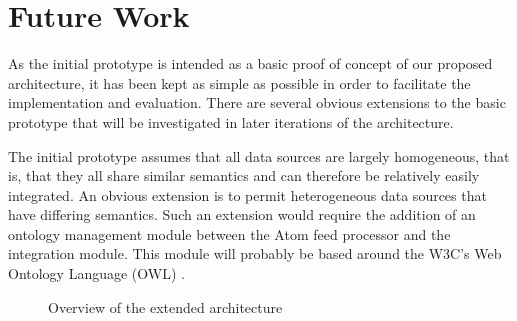 \documentclass{CRPITStyle}
\begin{document}
\section{Future Work}
\label{sec-future-work}

As the initial prototype is intended as a basic proof of concept of our
proposed architecture, it has been kept as simple as possible in order
to facilitate the implementation and evaluation. There are several
obvious extensions to the basic prototype that will be investigated in
later iterations of the architecture.

The initial prototype assumes that all data sources are largely
homogeneous, that is, that they all share similar semantics and can
therefore be relatively easily integrated. An obvious extension is to
permit heterogeneous data sources that have differing semantics. Such an
extension would require the addition of an ontology management module
between the Atom feed processor and the integration module. This module
will probably be based around the W3C's Web Ontology Language (OWL)
\cite{McGu-DL-2004-OWL}.

\begin{figure}[htb]
	\caption{Overview of the extended architecture}
	\label{fig-extended}
\end{figure}
\end{document}
